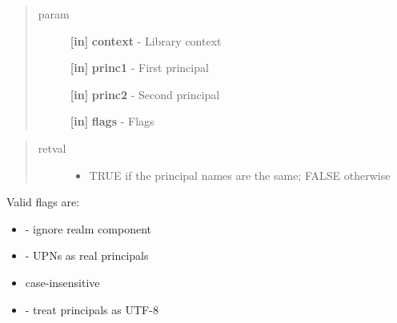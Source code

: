 \documentclass[letterpaper,10pt,english]{sphinxmanual}
\begin{document}
\begin{quote}\begin{description}
\item[{param}] \leavevmode
\textbf{{[}in{]}} \textbf{context} - Library context

\textbf{{[}in{]}} \textbf{princ1} - First principal

\textbf{{[}in{]}} \textbf{princ2} - Second principal

\textbf{{[}in{]}} \textbf{flags} - Flags

\end{description}\end{quote}
\begin{quote}\begin{description}
\item[{retval}] \leavevmode\begin{itemize}
\item {} 
TRUE   if the principal names are the same; FALSE otherwise

\end{itemize}

\end{description}\end{quote}

Valid flags are:
\begin{itemize}
\item {} 
{\hyperref[appdev/refs/macros/KRB5_PRINCIPAL_COMPARE_IGNORE_REALM:KRB5_PRINCIPAL_COMPARE_IGNORE_REALM]{}} - ignore realm component

\item {} 
{\hyperref[appdev/refs/macros/KRB5_PRINCIPAL_COMPARE_ENTERPRISE:KRB5_PRINCIPAL_COMPARE_ENTERPRISE]{}} - UPNs as real principals

\item {} 
{\hyperref[appdev/refs/macros/KRB5_PRINCIPAL_COMPARE_CASEFOLD:KRB5_PRINCIPAL_COMPARE_CASEFOLD]{}} case-insensitive

\item {} 
{\hyperref[appdev/refs/macros/KRB5_PRINCIPAL_COMPARE_UTF8:KRB5_PRINCIPAL_COMPARE_UTF8]{}} - treat principals as UTF-8

\end{itemize}




{\hyperref[appdev/refs/api/krb5_principal_compare:c.krb5_principal_compare]{}}
\end{document}
